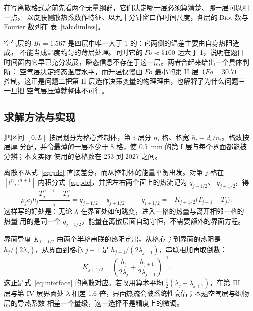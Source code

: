 \documentclass[withoutpreface,bwprint]{cumcmthesis}
\begin{document}
在写离散格式之前先看两个无量纲群，它们决定哪一层必须算清楚、哪一层可以粗一点。
以皮肤侧散热系数作特征、以九十分钟窗口作时间尺度，各层的 Biot 数与 Fourier 数列在
表~\ref{tab:dimless}。

\begin{table}[htbp]
  \centering
  \caption{各层的 Biot 数与 Fourier 数（附件 2 条件，$t_{\mathrm{w}}=\SI{5400}{s}$）}
  \label{tab:dimless}
  
\end{table}

空气层的 $\mathit{Bi}=1.567$ 是四层中唯一大于 1 的：它两侧的温差主要由自身热阻造成，
不能当成温度均匀的薄层处理。同时它的 $\mathit{Fo}\approx5100$ 远大于 1，说明在题目
时间窗内它早已充分发展，瞬态信息不存在于这一层。两者合起来给出一个具体判断：
空气层决定终态温度水平，而升温快慢由 $\mathit{Fo}$ 最小的第 II 层（$\mathit{Fo}=30.7$）
控制。这正是问题二把第 II 层选作决策变量的物理理由，也解释了为什么问题三一旦把
空气层压薄就整体不可行。

\subsection{求解方法与实现}

把区间 $[0,L]$ 按层划分为格心控制体，第 $i$ 层分 $n_i$ 格、格宽 $h_i=d_i/n_i$。格数按层厚
分配，并令最薄的一层不少于 8 格，使 \SI{0.6}{mm} 的第 I 层与每个界面都能被分辨；本文实际
使用的总格数在 253 到 2027 之间。

离散不从式~\eqref{eq:pde} 直接差分，而从控制体的能量平衡出发。对第 $j$ 格在
$[t^n,t^{n+1}]$ 内积分式~\eqref{eq:pde}，并把左右两个面上的热流记为 $q_{j-1/2}$、
$q_{j+1/2}$，得
\begin{equation}
  \rho_j c_j h_j \frac{T_j^{n+1}-T_j^{n}}{\tau}
  = q_{j-1/2}-q_{j+1/2},
  \qquad
  q_{j+1/2}=-K_{j+1/2}\bigl(T_{j+1}-T_j\bigr).
  \label{eq:fv}
\end{equation}
这样写的好处是：无论 $\lambda$ 在界面处如何跳变，进入一格的热量与离开相邻一格的热量
用的是同一个 $q_{j+1/2}$，能量在离散层面自动守恒，不需要额外的界面方程。

界面导度 $K_{j+1/2}$ 由两个半格串联的热阻定出。从格心 $j$ 到界面的热阻是
$h_j/(2\lambda_j)$，从界面到格心 $j+1$ 是 $h_{j+1}/(2\lambda_{j+1})$，串联相加再取倒数：
\begin{equation}
  K_{j+1/2}=\left(\frac{h_j}{2\lambda_j}+\frac{h_{j+1}}{2\lambda_{j+1}}\right)^{-1}.
  \label{eq:harmonic}
\end{equation}
这正是式~\eqref{eq:interface} 的离散对应。若改用算术平均
$\tfrac12(\lambda_j+\lambda_{j+1})$，在第 III 层与第 IV 层界面处
$\lambda$ 相差 \num{1.6} 倍，界面热流会被系统性高估；本题空气层与织物层的导热系数
相差一个量级，这一选择不是精度上的微调。
\end{document}
